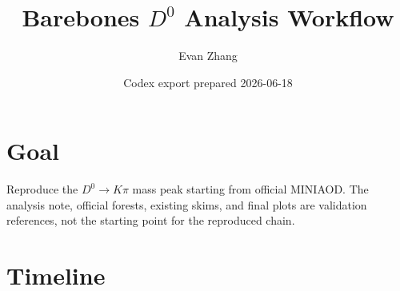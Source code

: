 \documentclass[10pt]{article}
\title{\texorpdfstring{Barebones \(D^0\) Analysis Workflow}{Barebones D0 Analysis Workflow}}
\author{Evan Zhang}
\date{Codex export prepared 2026-06-18}
\begin{document}
\maketitle
\vspace{-1.4em}

\section*{Goal}

Reproduce the \(D^0\to K\pi\) mass peak starting from official MINIAOD. The
analysis note, official forests, existing skims, and final plots are validation
references, not the starting point for the reproduced chain.

\section*{Timeline}
\end{document}
